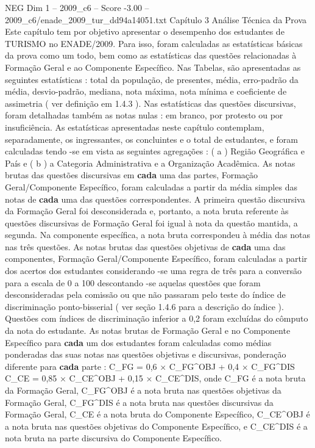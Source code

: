 \begin{textsample}{NEG Dim 1 – 2009\_c6 – Score -3.00 – 2009\_c6/enade\_2009\_tur\_dd94a14051.txt}  \label{ex:f1_neg_213}
Capítulo 3 Análise Técnica da Prova Este capítulo tem por objetivo apresentar o desempenho dos estudantes de TURISMO no ENADE/2009.
Para isso, foram calculadas as estatísticas básicas da prova como um todo, bem como as estatísticas das questões relacionadas à Formação Geral e ao Componente Específico.
Nas Tabelas, são apresentadas as seguintes estatísticas : total da população, de presentes, média, erro-padrão da média, desvio-padrão, mediana, nota máxima, nota mínima e coeficiente de assimetria ( ver definição em 1.4.3 ).
Nas estatísticas das questões discursivas, foram detalhadas também as notas nulas : em branco, por protesto ou por insuficiência.
As estatísticas apresentadas neste capítulo contemplam, separadamente, os ingressantes, os concluintes e o total de estudantes, e foram calculadas tendo -se em vista as seguintes agregações : ( a ) Região Geográfica e País e ( b ) a Categoria Administrativa e a Organização Acadêmica.
As notas brutas das questões discursivas em \textbf{cada} uma das partes, Formação Geral/Componente Específico, foram calculadas a partir da média simples das notas de \textbf{cada} uma das questões correspondentes.
A primeira questão discursiva da Formação Geral foi desconsiderada e, portanto, a nota bruta referente às questões discursivas de Formação Geral foi igual à nota da questão mantida, a segunda.
Na componente específica, a nota bruta correspondeu à média das notas nas três questões.
As notas brutas das questões objetivas de \textbf{cada} uma das componentes, Formação Geral/Componente Específico, foram calculadas a partir dos acertos dos estudantes considerando -se uma regra de três para a conversão para a escala de 0 a 100 descontando -se aquelas questões que foram desconsideradas pela comissão ou que não passaram pelo teste do índice de discriminação ponto-bisserial ( ver seção 1.4.6 para a descrição do índice ).
Questões com índices de discriminação inferior a 0,2 foram excluídas do cômputo da nota do estudante.
As notas brutas de Formação Geral e no Componente Específico para \textbf{cada} um dos estudantes foram calculadas como médias ponderadas das suas notas nas questões objetivas e discursivas, ponderação diferente para \textbf{cada} parte : C\_FG = 0,6 × C\_FG\textasciicircum{}OBJ + 0,4 × C\_FG\textasciicircum{}DIS C\_CE = 0,85 × C\_CE\textasciicircum{}OBJ + 0,15 × C\_CE\textasciicircum{}DIS, onde C\_FG é a nota bruta da Formação Geral, C\_FG\textasciicircum{}OBJ é a nota bruta nas questões objetivas da Formação Geral, C\_FG\textasciicircum{}DIS é a nota bruta nas questões discursivas da Formação Geral, C\_CE é a nota bruta do Componente Específico, C\_CE\textasciicircum{}OBJ é a nota bruta nas questões objetivas do Componente Específico, e C\_CE\textasciicircum{}DIS é a nota bruta na parte discursiva do Componente Específico.

\end{textsample}
